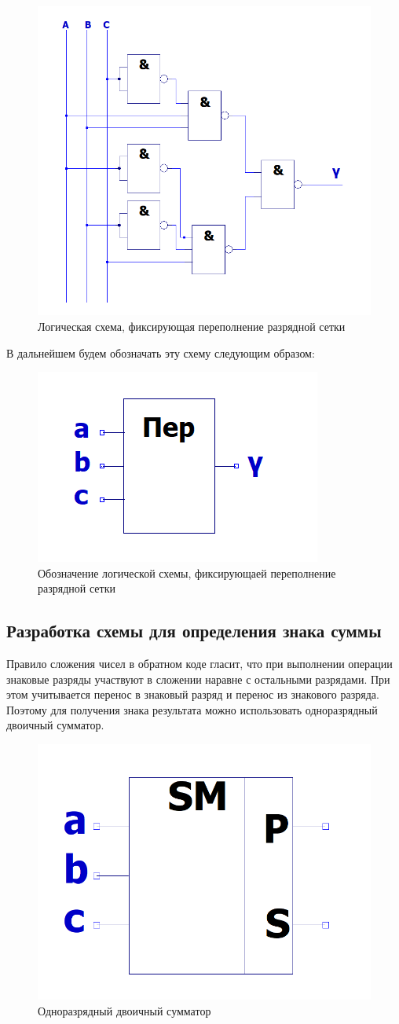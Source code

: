 \documentclass[a4paper,14pt]{article}
\begin{document}
\begin{figure}[H]
	\centering
	\includegraphics[width=0.5\linewidth]{schemas/per}
	\caption{Логическая схема, фиксирующая переполнение разрядной сетки}
	\label{fig:per}
\end{figure}

В дальнейшем будем обозначать эту схему следующим образом:

\begin{figure}[H]
	\centering
	\includegraphics[width=0.2\linewidth]{schemas/per_el}
	\caption{Обозначение логической схемы, фиксирующаей переполнение разрядной сетки}
	\label{fig:per_el}
\end{figure}

\subsection{Разработка схемы для определения знака суммы}

Правило сложения чисел в обратном коде гласит, что при выполнении операции знаковые разряды участвуют в сложении наравне с остальными разрядами. При этом учитывается  перенос в знаковый разряд и перенос из знакового разряда. Поэтому для получения знака результата можно использовать  одноразрядный двоичный сумматор.

\begin{figure}[H]
	\centering
	\includegraphics[width=0.3\linewidth]{schemas/sm_el}
	\caption{Одноразрядный двоичный сумматор}
	\label{fig:sm_el_2}
\end{figure}
\end{document}
